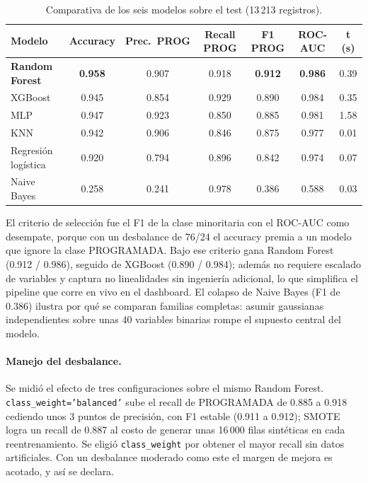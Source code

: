 \documentclass[11pt,a4paper]{article}
\begin{document}
\begin{table}[h]
      \centering
      \small
      \begin{tabular}{lcccccc}
            \toprule
            \textbf{Modelo}        & \textbf{Accuracy} & \textbf{Prec.\ PROG} & \textbf{Recall PROG} & \textbf{F1 PROG} & \textbf{ROC-AUC} & \textbf{t (s)} \\
            \midrule
            \textbf{Random Forest} & \textbf{0.958}    & 0.907                & 0.918                & \textbf{0.912}   & \textbf{0.986}   & 0.39           \\
            XGBoost                & 0.945             & 0.854                & 0.929                & 0.890            & 0.984            & 0.35           \\
            MLP                    & 0.947             & 0.923                & 0.850                & 0.885            & 0.981            & 1.58           \\
            KNN                    & 0.942             & 0.906                & 0.846                & 0.875            & 0.977            & 0.01           \\
            Regresión logística    & 0.920             & 0.794                & 0.896                & 0.842            & 0.974            & 0.07           \\
            Naive Bayes            & 0.258             & 0.241                & 0.978                & 0.386            & 0.588            & 0.03           \\
            \bottomrule
      \end{tabular}
      \caption{Comparativa de los seis modelos sobre el test (13\,213 registros).}
      \label{tab:comparativa}
\end{table}

El criterio de selección fue el F1 de la clase minoritaria con el ROC-AUC como
desempate, porque con un desbalance de 76/24 el accuracy premia a un modelo que
ignore la clase PROGRAMADA. Bajo ese criterio gana Random Forest (0.912 / 0.986),
seguido de XGBoost (0.890 / 0.984); además no requiere escalado de variables y
captura no linealidades sin ingeniería adicional, lo que simplifica el pipeline
que corre en vivo en el dashboard. El colapso de Naive Bayes (F1 de 0.386)
ilustra por qué se comparan familias completas: asumir gaussianas independientes
sobre unas 40 variables binarias rompe el supuesto central del modelo.

\paragraph{Manejo del desbalance.} Se midió el efecto de tres configuraciones
sobre el mismo Random Forest. \texttt{class\_weight='balanced'} sube el recall de
PROGRAMADA de 0.885 a 0.918 cediendo unos 3 puntos de precisión, con F1 estable
(0.911 a 0.912); SMOTE logra un recall de 0.887 al costo de generar unas 16\,000
filas sintéticas en cada reentrenamiento. Se eligió \texttt{class\_weight} por
obtener el mayor recall sin datos artificiales. Con un desbalance moderado como
este el margen de mejora es acotado, y así se declara.
\end{document}
